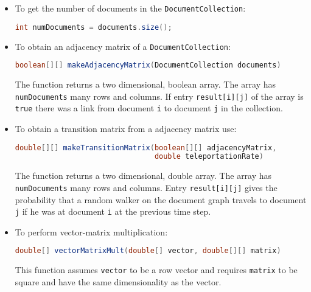 \documentclass[exam, sectionseven]{acAssignment}
\begin{document}
\begin{itemize}
    \item To get the number of documents in the \texttt{DocumentCollection}:
    
        \begin{lstlisting}[language=Java]
int numDocuments = documents.size();
        \end{lstlisting}
    
    \item To obtain an adjacency matrix of a \texttt{DocumentCollection}:
    
        \begin{lstlisting}[language=Java]
boolean[][] makeAdjacencyMatrix(DocumentCollection documents)
        \end{lstlisting}
        
        The function returns a two dimensional, boolean array.
        The array has \texttt{numDocuments} many rows and columns.
        If entry \texttt{result[i][j]} of the array is \texttt{true} there was a link from document \texttt{i} to document \texttt{j} in the collection.
    
    \item To obtain a transition matrix from a adjacency matrix use:
    
        \begin{lstlisting}[language=Java]
double[][] makeTransitionMatrix(boolean[][] adjacencyMatrix,
                                double teleportationRate)
        \end{lstlisting}
        
        The function returns a two dimensional, double array.
        The array has \texttt{numDocuments} many rows and columns.
        Entry \texttt{result[i][j]} gives the probability that a random walker on the document graph travels to document \texttt{j} if he was at document \texttt{i} at the previous time step.
    
    \item To perform vector-matrix multiplication:
    
        \begin{lstlisting}[language=Java]
double[] vectorMatrixMult(double[] vector, double[][] matrix)
        \end{lstlisting}
        
        This function assumes \texttt{vector} to be a row vector and requires \texttt{matrix} to be square and have the same dimensionality as the vector.
\end{itemize}
\end{document}
